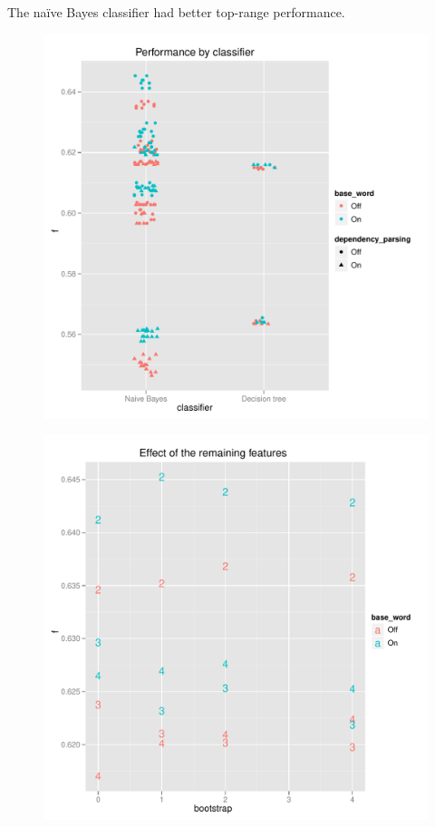 \documentclass{article}
\newcommand{\naive}{na\"ive}
\begin{document}
The \naive{} Bayes classifier had better top-range performance.

\begin{figure}
\includegraphics[width=\textwidth]{pg_0003}
\caption{\label{fig3}}
\end{figure}

\begin{figure}
\includegraphics[width=\textwidth]{pg_0004}
\caption{\label{fig4}}
\end{figure}
\end{document}
